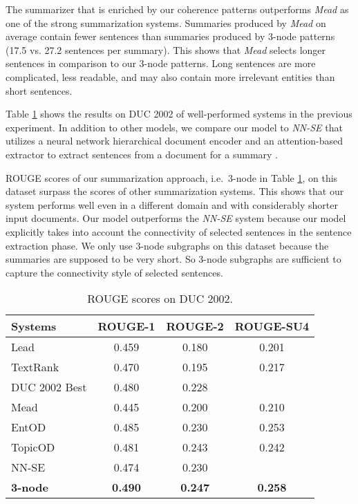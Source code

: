 The summarizer that is enriched by our coherence patterns outperforms \emph{Mead} as one of the strong summarization systems. 
Summaries produced by \emph{Mead} on average contain fewer sentences than summaries produced by 3-node patterns (17.5 vs. 27.2 sentences per summary).
This shows that \emph{Mead} selects longer sentences in comparison to our 3-node patterns.  
Long sentences are more complicated, less readable, and may also contain more irrelevant entities than short sentences. 

Table \ref{tab:summary-duc} shows the results on DUC 2002 of well-performed systems in the previous experiment. 
In addition to other models, we compare our model to \emph{NN-SE} that utilizes a neural network hierarchical document encoder and an \mbox{attention-based} extractor to extract sentences from a document for a summary \cite{chengjianpeng16}.

ROUGE scores of our summarization approach, i.e.\ 3-node in Table \ref{tab:summary-duc}, on this dataset surpass the scores of other summarization systems. 
This shows that our system performs well even in a different domain and with considerably shorter input documents. 
Our model outperforms the \emph{NN-SE} system because our model explicitly takes into account the connectivity of selected sentences in the sentence extraction phase. 
We only use 3-node subgraphs on this dataset because the summaries are supposed to be very short. 
So 3-node subgraphs are sufficient to capture the connectivity style of selected sentences. 


\begin{table}[!ht]
	\begin{center}
		\begin{tabular}{lccc}
			\toprule
			\textbf{Systems} 					& \textbf{ROUGE-1} 	& \textbf{ROUGE-2} 	& \textbf{ROUGE-SU4} \\
			\midrule
			Lead 						& 0.459 & 0.180 & 0.201	\\
			TextRank 					& 0.470 & 0.195 & 0.217	\\
			DUC 2002 Best 				& 0.480 & 0.228 & 		\\
			Mead 						& 0.445 & 0.200 & 0.210	\\
			EntOD						& 0.485 & 0.230 & 0.253 \\
			TopicOD 					& 0.481 & 0.243 & 0.242 \\
			NN-SE 						& 0.474 & 0.230 & 		\\
			\textbf{3-node} 						& \textbf{0.490} & \textbf{0.247} & \textbf{0.258}\\
			\bottomrule
		\end{tabular}
	\end{center}
	\caption{ROUGE scores on DUC 2002.}
	\label{tab:summary-duc}
\end{table}

